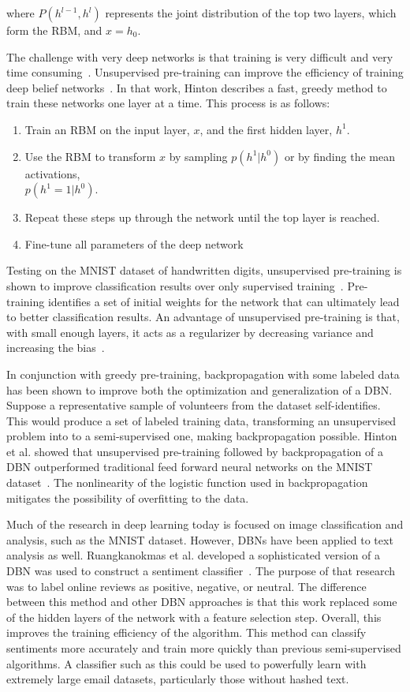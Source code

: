 \documentclass[12pt]{report}
\begin{document}
where $P(h^{l-1},h^l)$ represents the joint distribution of the top two layers, which form the RBM, and $x = h_0$.

The challenge with very deep networks is that training is very difficult and very time consuming~\cite{bengio_learning_2009}.
Unsupervised pre-training can improve the efficiency of training deep belief networks~\cite{hinton_recognize_2007}.
In that work, Hinton describes a fast, greedy method to train these networks one layer at a time.  This process is as follows:
\begin{enumerate}
\item Train an RBM on the input layer, $x$, and the first hidden layer, $h^1$.
\item Use the RBM to transform $x$ by sampling $p(h^1|h^0)$ or by finding the mean activations,\\ $p(h^1=1|h^0)$.
\item Repeat these steps up through the network until the top layer is reached.
\item Fine-tune all parameters of the deep network
\end{enumerate}

 
Testing on the MNIST dataset of handwritten digits, unsupervised pre-training is shown to improve classification results over only supervised training~\cite{erhan_why_2010}. 
Pre-training identifies a set of initial weights for the network that can ultimately lead to better classification results.  
An advantage of unsupervised pre-training is that, with small enough layers, it acts as a regularizer by decreasing variance and increasing the bias~\cite{hinton_recognize_2007}.  

In conjunction with greedy pre-training, backpropagation  with some labeled data has been shown to improve both the optimization and generalization of a DBN.
Suppose a representative sample of volunteers from the dataset self-identifies.
This would produce a set of labeled training data, transforming an unsupervised problem into to a semi-supervised one, making backpropagation possible.
Hinton et al. showed that unsupervised pre-training followed by backpropagation of a DBN outperformed traditional feed forward neural networks on the MNIST dataset~\cite{hinton_fast_2006}.
The nonlinearity of the logistic function used in backpropagation mitigates the possibility of overfitting to the data.

Much of the research in deep learning today is focused on image classification and analysis, such as the MNIST dataset.  However, DBNs have been applied to text analysis as well.
Ruangkanokmas et al. developed a sophisticated version of a DBN was used to construct a sentiment classifier~\cite{ruangkanokmas_deep}.
The purpose of that research was to label online reviews as positive, negative, or neutral.
The difference between this method and other DBN approaches is that this work replaced some of the hidden layers of the network with a feature selection step.
Overall, this improves the training efficiency of the algorithm.
This method can classify sentiments more accurately and train more quickly than previous semi-supervised algorithms.
A classifier such as this could be used to powerfully learn with extremely large email datasets, particularly those without hashed text.
\end{document}
